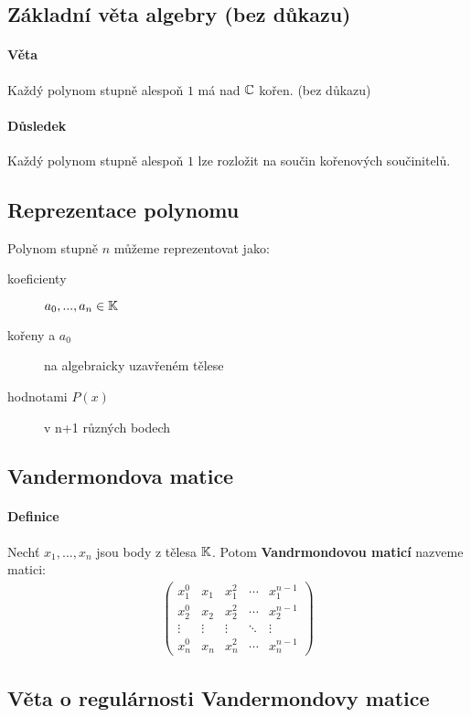 \documentclass[a4paper,10pt]{article}
\begin{document}
\subsection{Základní věta algebry (bez důkazu)}
\setcounter{equation}{0}
\paragraph{Věta}
Každý polynom stupně alespoň $1$ má nad $\mathbb{C}$ kořen.
(bez důkazu)
\paragraph{Důsledek}
Každý polynom stupně alespoň $1$ lze rozložit na součin kořenových součinitelů.

\subsection{Reprezentace polynomu}
\setcounter{equation}{0}
Polynom stupně $n$ můžeme reprezentovat jako:
\begin{description}
	\item[koeficienty] $a_0, ..., a_n \in \mathbb{K}$
	\item[kořeny a $a_0$] na algebraicky uzavřeném tělese
	\item[hodnotami $P(x)$] v n+1 různých bodech
\end{description}

\subsection{Vandermondova matice}
\setcounter{equation}{0}
\paragraph{Definice}
Nechť $x_1, ..., x_n$ jsou body z tělesa $\mathbb{K}$. Potom \textbf{Vandrmondovou
maticí} nazveme matici:
\begin{align*}
	\left(
	\begin{matrix}
		x_1^0 & x_1 & x^2_1 & \cdots & x^{n-1}_1 \\
		x_2^0 & x_2 & x^2_2 & \cdots & x^{n-1}_2 \\
		\vdots & \vdots & \vdots & \ddots & \vdots \\
		x_n^0 & x_n & x^2_n & \cdots & x^{n-1}_n
	\end{matrix}
	\right)
\end{align*}

\subsection{Věta o regulárnosti Vandermondovy matice}
\setcounter{equation}{0}
\end{document}
